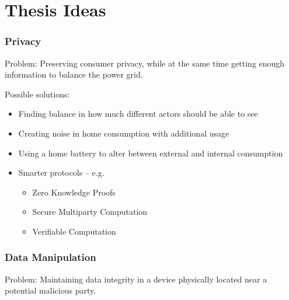 
\section{Thesis Ideas}

\begin{frame}
  \frametitle{Privacy}

  Problem: Preserving consumer privacy, while at the same time getting enough information to balance the power grid.

  Possible solutions:
  \begin{itemize}
    \item Finding balance in how much different actors should be able to see
    \item Creating noise in home consumption with additional usage
    \item Using a home battery to alter between external and internal consumption
    \item Smarter protocols -- e.g.
    \begin{itemize}
      \item Zero Knowledge Proofs
      \item Secure Multiparty Computation
      \item Verifiable Computation
    \end{itemize}
  \end{itemize}
\end{frame}

\begin{frame}
  \frametitle{Data Manipulation}

  Problem: Maintaining data integrity in a device physically located near a potential malicious party.
\end{frame}
